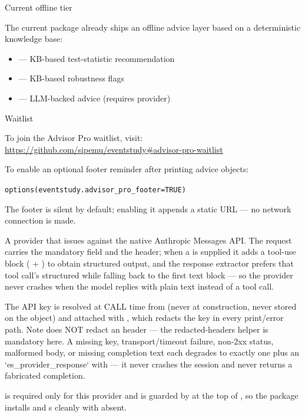 \documentclass[a4paper]{book}
\begin{document}
%
\begin{Section}{Current offline tier}

The current package already ships an offline advice layer based on a
deterministic knowledge base:
\begin{itemize}

\item{}  — KB-based test-statistic recommendation
\item{}  — KB-based robustness flags
\item{}  — LLM-backed advice (requires provider)

\end{itemize}

\end{Section}
%
\begin{Section}{Waitlist}

To join the Advisor Pro waitlist, visit:
\url{https://github.com/sipemu/eventstudy\#advisor-pro-waitlist}

To enable an optional footer reminder after printing advice objects:
\begin{alltt}options(eventstudy.advisor_pro_footer = TRUE)\end{alltt}

The footer is silent by default; enabling it appends a static URL — no
network connection is made.
\end{Section}
%
\begin{Description}
A provider that issues  against
the native Anthropic Messages API. The request carries the mandatory
 field and the  header; when a
 is supplied it adds a tool-use  block
( + ) to obtain structured output, and the
response extractor prefers that tool call's structured  while
falling back to the first text block — so the provider never crashes when the
model replies with plain text instead of a tool call.

The API key is resolved at CALL time from  (never at
construction, never stored on the object) and attached with
, which redacts the key in
every print/error path. Note  does NOT redact an
 header — the redacted-headers helper is mandatory here. A
missing key, transport/timeout failure, non-2xx status, malformed body, or
missing completion text each degrades to exactly one  plus an
`es\_provider\_response` with  — it never crashes the
session and never returns a fabricated completion.

 is required only for this provider and is guarded by
 at the top of , so the package
installs and s cleanly with  absent.
\end{Description}
\end{document}

